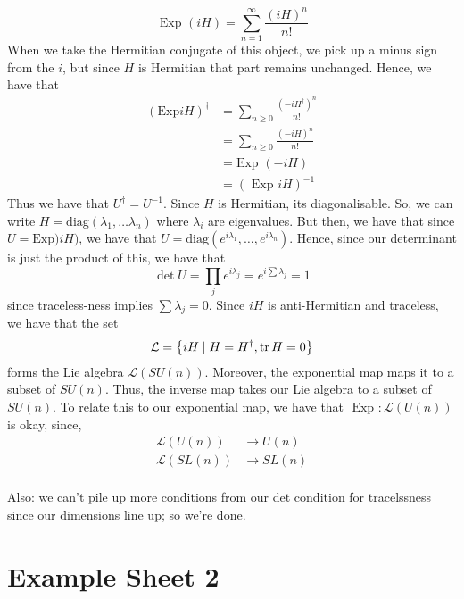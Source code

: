 \documentclass[11pt, oneside]{article}   	%
\theoremstyle{slanted}
\begin{document}
\[
	\text{ Exp } ( i H ) = \sum_{n=1}^{\infty} \frac{( i H ) ^ n }{ n ! }
\] When we take the Hermitian conjugate of this object, 
we pick up a minus sign from the $ i $, but since $ H $ is Hermitian that part 
remains unchanged. 
Hence, we have that 
\begin{align*}
	( \text{Exp} i H ) ^ \dagger &=  \sum_{ n \geq 0 } \frac{ ( - i H^\dagger ) ^ n }{ n ! } \\
				     &=  \sum_{ n \geq 0 } \frac{  ( - i H ) ^ n }{ n ! } \\
				     &=  \text{Exp } ( - i H )  \\
				     &=  ( \text{ Exp } i H )^{ - 1 }
\end{align*}
Thus we have that $ U^ \dagger = U ^{ - 1}$. 
Since $ H $ is Hermitian, its diagonalisable. 
So, we can write $ H = \text{diag} ( \lambda_1 , \dots \lambda_ n ) $ 
where $ \lambda_ i $ are eigenvalues. 
But then, we have that since $ U = \text{Exp} ) i H ) $, 
we have that $ U = \text{diag} ( e^{ i \lambda_1  } , \dots , e^{ i \lambda_n } ) $. 
Hence, since our determinant is just the product of this, we
have that 
\[
 \det U = \prod_{ j } e^{  i \lambda_j  } = e^{ i \sum \lambda_ j } = 1 
\] since traceless-ness implies $ \sum \lambda_ j = 0 $. 
Since  $ i H $ is anti-Hermitian and traceless, we have that the set 
\[
 \mathcal{ L } = \left\{  i H \mid H  = H^\dagger, \tr H = 0 \right\} 
\] forms the Lie algebra $ \mathcal{ L } ( S U ( n ) ) $. 
Moreover, the exponential map maps it to a subset of $ SU ( n ) $. 
Thus, the inverse map takes our Lie algebra to a subset of  $ SU ( n ) $. 
To relate this to our exponential map, 
we have that $ \text{ Exp } : \mathcal{ L } ( U ( n ) )  $ is okay, since, 
\begin{align*}
	\mathcal{ L } ( U ( n ) )  & \to U ( n ) \\
	\mathcal{ L } ( SL ( n ) ) & \to SL ( n ) \\
\end{align*}

Also: we can't pile up more
conditions from our det condition for tracelssness since 
our dimensions line up; so we're done. 
\pagebreak 
\section{Example Sheet 2} 
\end{document}
